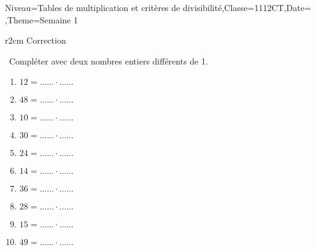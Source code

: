\documentclass[a4paper,11pt,fleqn]{article}
\begin{document}
\begin{Maquette}[Fiche, CorrigeApres=false, CorrigeFin=true]{Niveau=Tables de multiplication et critères de divisibilité,Classe=1112CT,Date=   ,Theme=Semaine 1}
\begin{exercice}
\begin{wrapfigure}{r}{2cm}
\centering
{\hypersetup{urlcolor=black}
}
Correction
\end{wrapfigure}\ 
Compléter avec deux nombres entiers différents de 1.
\begin{enumerate}[itemsep=1em]
	\item $12= \ldots\ldots \cdot \ldots\ldots$
	\item $48= \ldots\ldots \cdot \ldots\ldots$
	\item $10= \ldots\ldots \cdot \ldots\ldots$
	\item $30= \ldots\ldots \cdot \ldots\ldots$
	\item $24= \ldots\ldots \cdot \ldots\ldots$
	\item $14= \ldots\ldots \cdot \ldots\ldots$
	\item $36= \ldots\ldots \cdot \ldots\ldots$
	\item $28= \ldots\ldots \cdot \ldots\ldots$
	\item $15= \ldots\ldots \cdot \ldots\ldots$
	\item $49= \ldots\ldots \cdot \ldots\ldots$
\end{enumerate}
\end{exercice}


\end{Maquette}
\end{document}
